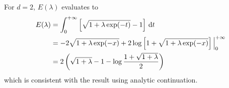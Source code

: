 \documentclass{report}
\begin{document}


For $d=2$, $E(\lambda)$ evaluates to
\begin{equation}
  \begin{split}
  E(\lambda) &= \int^{+\infty}_0 \left[\sqrt{1+\lambda \exp(-t)} -1\right]\,{\rm d}t\\
  &= -2\sqrt{1+\lambda\exp(-x)} + 2\log\left[1+\sqrt{1+\lambda\exp(-x)}\right]\Big|^{+\infty}_0\\
  &= 2\left(\sqrt{1+\lambda} -1 -\log\frac{1+\sqrt{1+\lambda}}{2}\right)
  \end{split}
\end{equation}
which is consistent with the result using analytic continuation.

\bigbreak
\end{document}
